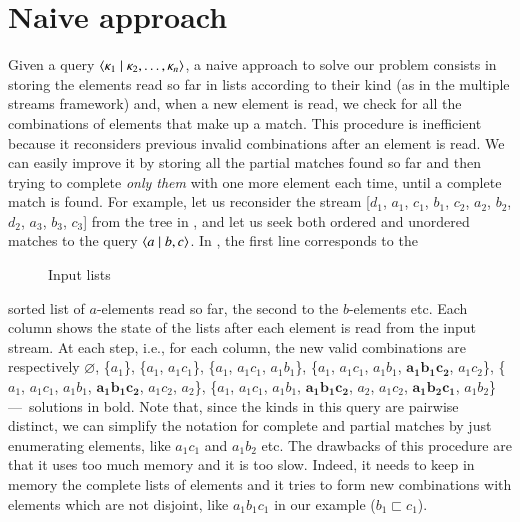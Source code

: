 
\section{Naive approach}
\label{naive}

\noindent Given a query \(\langle \kappa_1 \mid \kappa_2, \dots,
  \kappa_n\rangle\), a naive approach to solve our problem consists in
storing the elements read so far in lists according to their kind (as
in the multiple streams framework) and, when a new element is read, we
check for all the combinations of elements that make up a match. This
procedure is inefficient because it reconsiders previous invalid
combinations after an element is read. We can easily improve it by
storing all the partial matches found so far and then trying to
complete \emph{only them} with one more element each time, until a
complete match is found. For example, let us reconsider the stream
[\(d_1\), \(a_1\), \(c_1\), \(b_1\), \(c_2\), \(a_2\), \(b_2\),
  \(d_2\), \(a_3\), \(b_3\), \(c_3\)] from the \XML tree in
, and let us seek both ordered and unordered matches
to the query \(\langle a \mid b,c\rangle\). In , the first
line corresponds to the
\begin{figure}
\centering
{}
\caption{Input lists}
\label{fig:input_lists}
\end{figure}
sorted list of \(a\)-elements read so far, the second to the
\(b\)-elements etc. Each column shows the state of the lists after
each element is read from the input stream.  At each step, i.e., for
each column, the new valid combinations are respectively
\(\varnothing\), \{\(a_1\)\}, \{\(a_1\), \(a_1c_1\)\}, \{\(a_1\),
\(a_1c_1\), \(a_1b_1\)\}, \{\(a_1\), \(a_1c_1\), \(a_1b_1\),
\(\mathbf{a_1b_1c_2}\), \(a_1c_2\)\}, \{\(a_1\), \(a_1c_1\),
\(a_1b_1\), \(\mathbf{a_1b_1c_2}\), \(a_1c_2\), \(a_2\)\}, \{\(a_1\),
\(a_1c_1\), \(a_1b_1\), \(\mathbf{a_1b_1c_2}\), \(a_2\), \(a_1c_2\),
\(\mathbf{a_1b_2c_1}\), \(a_1b_2\)\} ---~solutions in bold. Note that,
since the kinds in this query are pairwise distinct, we can simplify
the notation for complete and partial matches by just enumerating
elements, like \(a_1c_1\) and \(a_1b_2\) etc. The drawbacks of this
procedure are that it uses too much memory and it is too slow. Indeed,
it needs to keep in memory the complete lists of elements and it tries
to form new combinations with elements which are not disjoint, like
\(a_1b_1c_1\) in our example (\(b_1 \sqsubset c_1\)).
